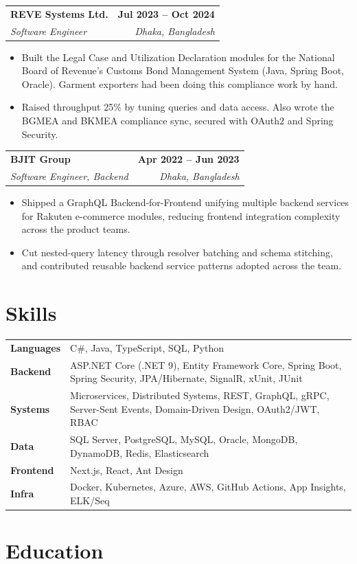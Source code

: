 \documentclass[letterpaper,10.5pt]{article}
\makeatletter
\newcommand{\entry}[4]{%
  \needspace{5\baselineskip}
  \begin{tabularx}{\textwidth}{@{}Xr@{}}
    \textbf{#1} & \textbf{#2} \\
    \textit{#3} & \textit{#4} \\
  \end{tabularx}
  \nopagebreak
  \vspace{-2pt}
}
\newenvironment{points}
  {\begin{itemize}[leftmargin=12pt, itemsep=1.5pt, topsep=3pt, parsep=0pt, label=$\bullet$]}
  {\end{itemize}\vspace{4pt}}
\makeatother
\begin{document}
\entry{REVE Systems Ltd.}{Jul 2023 -- Oct 2024}{Software Engineer}{Dhaka, Bangladesh}
\begin{points}
\item Built the Legal Case and Utilization Declaration modules for the National Board of Revenue's Customs Bond Management System (Java, Spring Boot, Oracle). Garment exporters had been doing this compliance work by hand.
\item Raised throughput 25\% by tuning queries and data access. Also wrote the BGMEA and BKMEA compliance sync, secured with OAuth2 and Spring Security.
\end{points}

\entry{BJIT Group}{Apr 2022 -- Jun 2023}{Software Engineer, Backend}{Dhaka, Bangladesh}
\begin{points}
\item Shipped a GraphQL Backend-for-Frontend unifying multiple backend services for Rakuten e-commerce modules, reducing frontend integration complexity across the product teams.
\item Cut nested-query latency through resolver batching and schema stitching, and contributed reusable backend service patterns adopted across the team.
\end{points}

\section{Skills}

\begin{tabularx}{\textwidth}{@{}p{2.4cm}X@{}}
\textbf{Languages} & C\#, Java, TypeScript, SQL, Python \\[3pt]
\textbf{Backend} & ASP.NET Core (.NET 9), Entity Framework Core, Spring Boot, Spring Security, JPA/Hibernate, \mbox{SignalR}, xUnit, JUnit \\[3pt]
\textbf{Systems} & Microservices, Distributed Systems, REST, GraphQL, gRPC, Server-Sent Events, Domain-Driven Design, OAuth2/JWT, RBAC \\[3pt]
\textbf{Data} & SQL Server, PostgreSQL, MySQL, Oracle, MongoDB, DynamoDB, Redis, Elasticsearch \\[3pt]
\textbf{Frontend} & Next.js, React, Ant Design \\[3pt]
\textbf{Infra} & Docker, Kubernetes, Azure, AWS, GitHub Actions, App Insights, ELK/Seq \\
\end{tabularx}

\section{Education}
\end{document}
